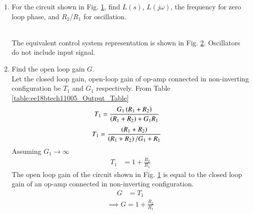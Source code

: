 \begin{enumerate}[label=\thesection.\arabic*.,ref=\thesection.\theenumi]

\item For the circuit shown in Fig. \ref{fig:ee18btech11047_fig1}, find $L(s)$, $L(j\omega)$, the frequency for zero loop phase, and $R_{2}/R_{1}$ for oscillation.
\renewcommand{\thefigure}{\theenumi.\arabic{figure}}
%
\begin{figure}[!ht]
	\begin{center}
		\resizebox{\columnwidth}{!}{}
	\end{center}
\caption{}
\label{fig:ee18btech11047_fig1}
\end{figure}
%
\\
\solution The equivalent control system representation is shown in Fig. \ref{fig:ee18btech11047_fig2}. Oscillators do not include input signal.
\begin{figure}[!ht]
	\begin{center}
		\resizebox{\columnwidth}{!}{}
	\end{center}
\caption{}
\label{fig:ee18btech11047_fig2}
\end{figure}
\renewcommand{\thefigure}{\theenumi}
%
\item Find the open loop gain $G$.\\
\label{prob:ee18btech11047_G}
\solution Let the closed loop gain, open-loop gain of op-amp connected in non-inverting configuration be $T_{1}$ and $G_{1}$ respectively.
From Table \ref{table:ee18btech11005_Output_Table}
\begin{align}
T_{1} &= \frac{G_{1}\left(R_1+R_2\right)}{\left(R_1+R_2\right)+G_{1}R_1}
\end{align}
\begin{align}
T_{1} &= \frac{\left(R_1+R_2\right)}{\left(R_1+R_2\right)/G_{1}+R_1}
\end{align}
Assuming $G_{1}\to\infty$
\begin{align}
T_{1} &= 1 + \frac{R_{2}}{R_{1}}
\end{align}
The open loop gain of the circuit shown in Fig. \ref{fig:ee18btech11047_fig1} is equal to the closed loop gain of an op-amp connected in non-inverting configuration.
\begin{align}
G &= T_{1}
\end{align}
\begin{align}
\label{eq:ee18btech11047_1}
\implies G = 1 + \frac{R_{2}}{R_{1}}

\end{align}
\end{enumerate}

